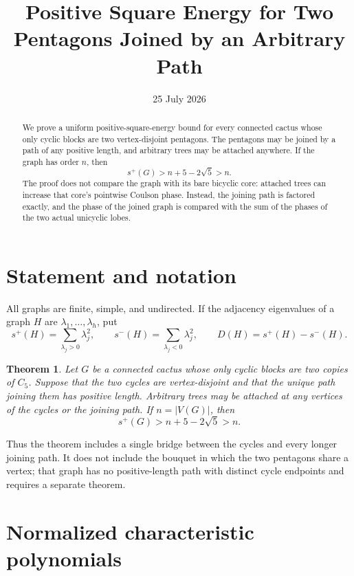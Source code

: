 \documentclass[11pt]{article}
\title{Positive Square Energy for Two Pentagons Joined by an Arbitrary Path}
\author{}
\date{25 July 2026}
\newtheorem{theorem}{Theorem}[section]
\theoremstyle{remark}
\begin{document}
\maketitle

\begin{abstract}
We prove a uniform positive-square-energy bound for every connected cactus
whose only cyclic blocks are two vertex-disjoint pentagons.  The pentagons may
be joined by a path of any positive length, and arbitrary trees may be attached
anywhere.  If the graph has order $n$, then
\[
 s^+(G)>n+5-2\sqrt5>n.
\]
The proof does not compare the graph with its bare bicyclic core: attached
trees can increase that core's pointwise Coulson phase.  Instead, the joining
path is factored exactly, and the phase of the joined graph is compared with
the sum of the phases of the two actual unicyclic lobes.
\end{abstract}

\section{Statement and notation}

All graphs are finite, simple, and undirected.  If the adjacency eigenvalues
of a graph $H$ are $\lambda_1,\ldots,\lambda_h$, put
\[
 s^+(H)=\sum_{\lambda_j>0}\lambda_j^2,
 \qquad
 s^-(H)=\sum_{\lambda_j<0}\lambda_j^2,
 \qquad
 D(H)=s^+(H)-s^-(H).
\]

\begin{theorem}\label{thm:main}
Let $G$ be a connected cactus whose only cyclic blocks are two copies of
$C_5$.  Suppose that the two cycles are vertex-disjoint and that the unique
path joining them has positive length.  Arbitrary trees may be attached at
any vertices of the cycles or the joining path.  If $n=|V(G)|$, then
\begin{equation}\label{eq:main}
 s^+(G)>n+5-2\sqrt5>n.
\end{equation}
\end{theorem}

Thus the theorem includes a single bridge between the cycles and every longer
joining path.  It does not include the bouquet in which the two pentagons
share a vertex; that graph has no positive-length path with distinct cycle
endpoints and requires a separate theorem.

\section{Normalized characteristic polynomials}
\end{document}
